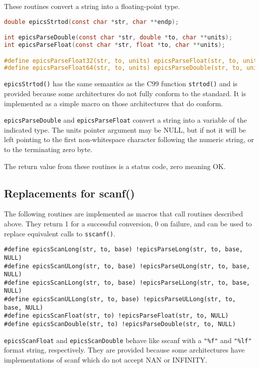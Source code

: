 These routines convert a string into a floating-point type.

\begin{lstlisting}[language=C]
double epicsStrtod(const char *str, char **endp);

int epicsParseDouble(const char *str, double *to, char **units);
int epicsParseFloat(const char *str, float *to, char **units);

#define epicsParseFloat32(str, to, units) epicsParseFloat(str, to, units)
#define epicsParseFloat64(str, to, units) epicsParseDouble(str, to, units)
\end{lstlisting}

\verb|epicsStrtod()| has the same semantics as the C99 function \verb|strtod()| and is provided because some architectures do not fully conform to the standard. It is implemented as a simple macro on those architectures that do conform.

\verb|epicsParseDouble| and \verb|epicsParseFloat| convert a string into a variable of the indicated type.
The units pointer argument may be NULL, but if not it will be left pointing to the first non-whitespace character following the numeric string, or to the terminating zero byte.

The return value from these routines is a status code, zero meaning OK.

\subsection{Replacements for scanf()}

The following routines are implemented as macros that call routines described above.
They return 1 for a successful conversion, 0 on failure, and can be used to replace equivalent calls to \verb|sscanf()|.

\begin{verbatim}
#define epicsScanLong(str, to, base) !epicsParseLong(str, to, base, NULL)
#define epicsScanULong(str, to, base) !epicsParseULong(str, to, base, NULL)
#define epicsScanLLong(str, to, base) !epicsParseLLong(str, to, base, NULL)
#define epicsScanULLong(str, to, base) !epicsParseULLong(str, to, base, NULL)
#define epicsScanFloat(str, to) !epicsParseFloat(str, to, NULL)
#define epicsScanDouble(str, to) !epicsParseDouble(str, to, NULL)
\end{verbatim}


\verb|epicsScanFloat| and \verb|epicsScanDouble| behave like sscanf with a \verb|"%f"| and \verb|"%lf"| format string, respectively.
They are provided because some architectures have implementations of scanf which do not accept NAN or INFINITY.

